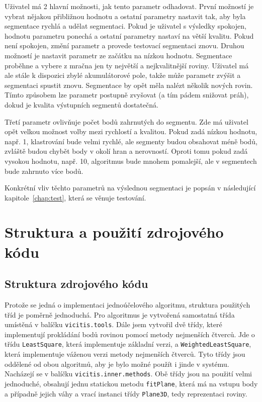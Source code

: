 \documentclass[11pt,twoside,a4paper]{book}
\begin{document}
Uživatel má 2 hlavní možnosti, jak tento parametr odhadovat. První možností je vybrat nějakou přibližnou hodnotu a ostatní parametry nastavit tak, aby byla segmentace rychlá a udělat  segmentaci. Pokud je uživatel s výsledky spokojen, hodnotu parametru ponechá a ostatní parametry nastaví na větší kvalitu. Pokud není spokojen, změní parametr a provede testovací segmentaci znovu. Druhou možností je nastavit parametr ze začátku na nízkou hodnotu. Segmentace proběhne a vybere z mračna jen ty největší a nejkvalitnější roviny. Uživatel má ale stále k dispozici zbylé akumulátorové pole, takže může parametr zvýšit a segmentaci spustit znovu. Segmentace by opět měla nalézt několik nových rovin. Tímto způsobem lze parametr postupně zvyšovat (a tím pádem snižovat práh), dokud je kvalita výstupních segmentů dostatečná.

Třetí parametr ovlivňuje počet bodů zahrnutých do segmentu. Zde má uživatel opět velkou možnost volby mezi rychlostí a kvalitou. Pokud zadá nízkou hodnotu, např. 1, klastrování bude velmi rychlé, ale segmenty budou obsahovat méně bodů, zvláště budou chybět body v okolí hran a nerovností. Oproti tomu pokud zadá vysokou hodnotu, např. 10, algoritmus bude mnohem pomalejší, ale v segmentech bude zahrnuto více bodů.

Konkrétní vliv těchto parametrů na výslednou segmentaci je popsán v následující kapitole~\ref{chap:test}, která se věnuje testování.

\section{Struktura a použití zdrojového kódu}


\subsection{Struktura zdrojového kódu}

Protože se jedná o implementaci jednoúčelového algoritmu, struktura použitých tříd je poměrně jednoduchá. Pro  algoritmus je vytvořená samostatná třída umístěná v balíčku \verb|vicitis.tools|. Dále jsem vytvořil dvě třídy, které implementují prokládání bodů rovinou pomocí metody nejmenších čtverců. Jde o třídu \verb|LeastSquare|, která implementuje základní verzi, a \verb|WeightedLeastSquare|, která implementuje váženou verzi metody nejmenších čtverců. Tyto třídy jsou oddělené od obou algoritmů, aby je bylo možné použít i jinde v systému. Nacházejí se v balíčku \verb|vicitis.inner.methods|. Obě třídy jsou na použití velmi jednoduché, obsahují jednu statickou metodu \verb|fitPlane|, která má na vstupu body a případně jejich váhy a vrací instanci třídy \verb|Plane3D|, tedy reprezentaci roviny.
\end{document}
